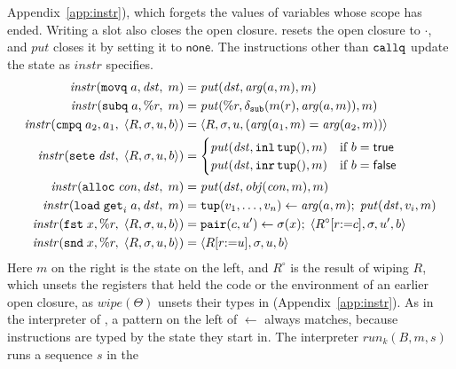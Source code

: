 Appendix~\ref{app:instr}), which forgets the
values of variables whose scope has ended. Writing a slot also closes
the open closure.  resets the open closure to $\cdot$, and
$\mathit{put}$ closes it by setting it to $\mathsf{none}$. The
instructions other than $\mathtt{callq}$ update the state as $\mathit{instr}$
specifies.
\begin{align*}
  \mathit{instr}(\mathtt{movq}\; a, \mathit{dst},\; m) &= \mathit{put}(\mathit{dst}, \mathit{arg}(a, m), m) \\
  \mathit{instr}(\mathtt{subq}\; a, \%r,\; m) &= \mathit{put}(\%r, \delta_{\mathtt{sub}}(m(r), \mathit{arg}(a, m)), m) \\
  \mathit{instr}(\mathtt{cmpq}\; a_2, a_1,\; \langle R, \sigma, u, b\rangle) &= \langle R, \sigma, u, (\mathit{arg}(a_1, m) = \mathit{arg}(a_2, m))\rangle \\
  \mathit{instr}(\mathtt{sete}\; \mathit{dst},\; \langle R, \sigma, u, b\rangle) &= \begin{cases}
      \mathit{put}(\mathit{dst}, \mathtt{inl}\,\mathtt{tup}(), m) & \text{if } b = \mathsf{true}\\
      \mathit{put}(\mathit{dst}, \mathtt{inr}\,\mathtt{tup}(), m) & \text{if } b = \mathsf{false}
    \end{cases} \\
  \mathit{instr}(\mathtt{alloc}\; \mathit{con}, \mathit{dst},\; m) &= \mathit{put}(\mathit{dst}, \mathit{obj}(\mathit{con}, m), m) \\
  \mathit{instr}(\mathtt{load}\; \mathtt{get}_i\; a, \mathit{dst},\; m) &= \mathtt{tup}(v_1, \ldots, v_n) \leftarrow \mathit{arg}(a, m);\; \mathit{put}(\mathit{dst}, v_i, m) \\
  \mathit{instr}(\mathtt{fst}\; x, \%r,\; \langle R, \sigma, u, b\rangle) &= \mathtt{pair}(c, u') \leftarrow \sigma(x);\; \langle R^{\circ}[r{:=}c], \sigma, u', b\rangle \\
  \mathit{instr}(\mathtt{snd}\; x, \%r,\; \langle R, \sigma, u, b\rangle) &= \langle R[r{:=}u], \sigma, u, b\rangle
\end{align*}
Here $m$ on the right is the state on the left, and $R^{\circ}$ is the
result of wiping $R$, which unsets the registers that held the code or the
environment of an earlier open closure, as $\mathit{wipe}(\Theta)$ unsets their
types in  (Appendix~\ref{app:instr}). As in the interpreter of \fpc, a pattern on the left
of $\leftarrow$ always matches, because instructions are typed by the
state they start in.
The interpreter $\mathit{run}_k(B, m, s)$ runs a sequence $s$ in the
